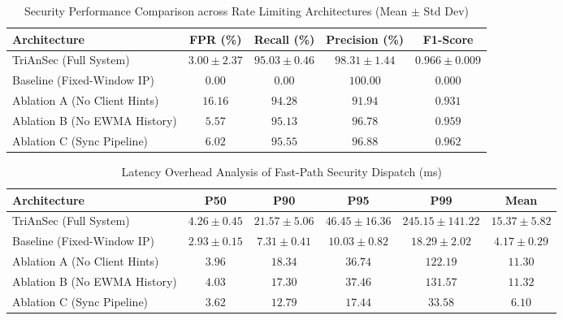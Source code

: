 \begin{table}[htbp]
\centering
\caption{Security Performance Comparison across Rate Limiting Architectures (Mean $\pm$ Std Dev)}
\label{tab:security_metrics}
\begin{tabular}{lcccc}
\hline
\textbf{Architecture} & \textbf{FPR (\%)} & \textbf{Recall (\%)} & \textbf{Precision (\%)} & \textbf{F1-Score} \\ \hline
TriAnSec (Full System) & $3.00 \pm 2.37$ & $95.03 \pm 0.46$ & $98.31 \pm 1.44$ & $0.966 \pm 0.009$ \\
Baseline (Fixed-Window IP) & $0.00$ & $0.00$ & $100.00$ & $0.000$ \\
Ablation A (No Client Hints) & $16.16$ & $94.28$ & $91.94$ & $0.931$ \\
Ablation B (No EWMA History) & $5.57$ & $95.13$ & $96.78$ & $0.959$ \\
Ablation C (Sync Pipeline) & $6.02$ & $95.55$ & $96.88$ & $0.962$ \\
\hline
\end{tabular}
\end{table}

\begin{table}[htbp]
\centering
\caption{Latency Overhead Analysis of Fast-Path Security Dispatch (ms)}
\label{tab:latency_metrics}
\begin{tabular}{lccccc}
\hline
\textbf{Architecture} & \textbf{P50} & \textbf{P90} & \textbf{P95} & \textbf{P99} & \textbf{Mean} \\ \hline
TriAnSec (Full System) & $4.26 \pm 0.45$ & $21.57 \pm 5.06$ & $46.45 \pm 16.36$ & $245.15 \pm 141.22$ & $15.37 \pm 5.82$ \\
Baseline (Fixed-Window IP) & $2.93 \pm 0.15$ & $7.31 \pm 0.41$ & $10.03 \pm 0.82$ & $18.29 \pm 2.02$ & $4.17 \pm 0.29$ \\
Ablation A (No Client Hints) & $3.96$ & $18.34$ & $36.74$ & $122.19$ & $11.30$ \\
Ablation B (No EWMA History) & $4.03$ & $17.30$ & $37.46$ & $131.57$ & $11.32$ \\
Ablation C (Sync Pipeline) & $3.62$ & $12.79$ & $17.44$ & $33.58$ & $6.10$ \\
\hline
\end{tabular}
\end{table}
